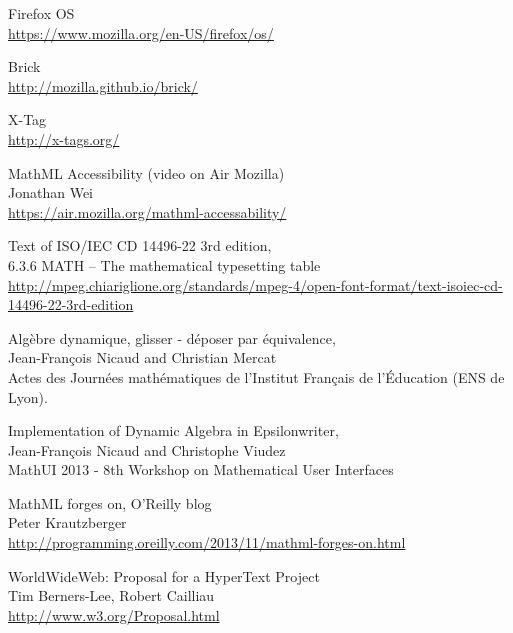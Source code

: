 \begin{thebibliography}{8}
Firefox OS \\
\href{https://www.mozilla.org/en-US/firefox/os/}{https://www.mozilla.org/en-US/firefox/os/}

Brick \\
\href{http://mozilla.github.io/brick/}{http://mozilla.github.io/brick/}

X-Tag \\
\href{http://x-tags.org/}{http://x-tags.org/}

MathML Accessibility (video on Air Mozilla) \\
Jonathan Wei \\
\href{https://air.mozilla.org/mathml-accessability/}{https://air.mozilla.org/mathml-accessability/}

Text of ISO/IEC CD 14496-22 3rd edition, \\
6.3.6 MATH – The mathematical typesetting table \\
\href{http://mpeg.chiariglione.org/standards/mpeg-4/open-font-format/text-isoiec-cd-14496-22-3rd-edition}{http://mpeg.chiariglione.org/standards/mpeg-4/open-font-format/text-isoiec-cd-14496-22-3rd-edition}

Algèbre dynamique, glisser - déposer par équivalence, \\
Jean-François Nicaud and Christian Mercat \\
Actes des Journées mathématiques de l'Institut Français de l'Éducation (ENS de Lyon).

Implementation of Dynamic Algebra in Epsilonwriter, \\
Jean-François Nicaud and Christophe Viudez \\
MathUI 2013 - 8th Workshop on Mathematical User Interfaces

MathML forges on, O'Reilly blog \\
Peter Krautzberger \\
\href{http://programming.oreilly.com/2013/11/mathml-forges-on.html}{http://programming.oreilly.com/2013/11/mathml-forges-on.html}

WorldWideWeb: Proposal for a HyperText Project \\
Tim Berners-Lee, Robert Cailliau \\
\href{http://www.w3.org/Proposal.html}{http://www.w3.org/Proposal.html}


\end{thebibliography}
